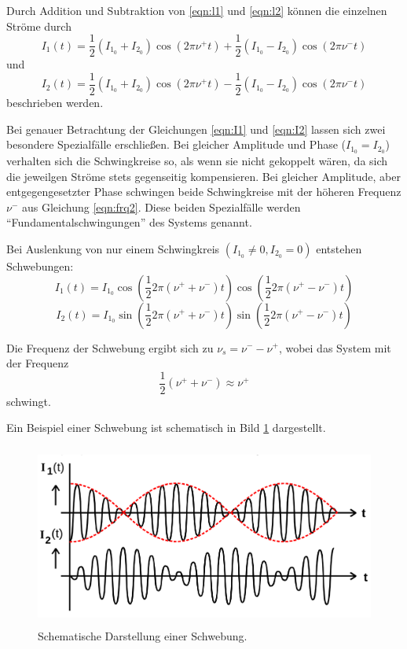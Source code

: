 Durch Addition und Subtraktion von \eqref{eqn:l1} und \eqref{eqn:l2} können die einzelnen Ströme durch
\begin{equation}
\label{eqn:I1}
    I_1(t)=\frac{1}{2}(I_{1_0}+I_{2_0})\cos(2\pi\nu^+t)+\frac{1}{2}(I_{1_0}-I_{2_0})\cos(2\pi\nu^-t)
\end{equation}
und 
\begin{equation} 
\label{eqn:I2}
    I_2(t)=\frac{1}{2}(I_{1_0}+I_{2_0})\cos(2\pi\nu^+t)-\frac{1}{2}(I_{1_0}-I_{2_0})\cos(2\pi\nu^-t)
\end{equation}
beschrieben werden.

Bei genauer Betrachtung der Gleichungen \eqref{eqn:I1} und \eqref{eqn:I2} lassen sich zwei besondere Spezialfälle erschließen.
Bei gleicher Amplitude und Phase ($I_{1_0}=I_{2_0}$) verhalten sich die Schwingkreise so, als wenn sie nicht gekoppelt wären, da sich die 
jeweilgen Ströme stets gegenseitig kompensieren. Bei gleicher Amplitude, aber entgegengesetzter Phase schwingen beide Schwingkreise mit 
der höheren Frequenz $\nu^-$ aus Gleichung \eqref{eqn:frq2}. Diese beiden Spezialfälle werden \enquote{Fundamentalschwingungen} des Systems genannt.

Bei Auslenkung von nur einem Schwingkreis $(I_{1_0}\neq 0,I_{2_0}=0)$ entstehen Schwebungen:
\begin{equation}
    I_1(t)=I_{1_0}\cos(\frac{1}{2}2\pi\left(\nu^++\nu^-\right)t)\cos(\frac{1}{2}2\pi\left(\nu^+-\nu^-\right)t)
\end{equation}
\begin{equation}
    I_2(t)=I_{1_0}\sin(\frac{1}{2}2\pi\left(\nu^++\nu^-\right)t)\sin(\frac{1}{2}2\pi\left(\nu^+-\nu^-\right)t)
\end{equation}

Die Frequenz der Schwebung ergibt sich zu $\nu_s=\nu^--\nu^+$, wobei das System mit der Frequenz
\begin{equation}
    \frac{1}{2}(\nu^++\nu^-)\approx \nu^+
\end{equation}
schwingt.

Ein Beispiel einer Schwebung ist schematisch in Bild \ref{fig:bild3} dargestellt.
\begin{figure}

    \centering
    \includegraphics[height=6.0cm]{data/Bild3.png}
    \caption{Schematische Darstellung einer Schwebung.}
    \label{fig:bild3}
\end{figure}

